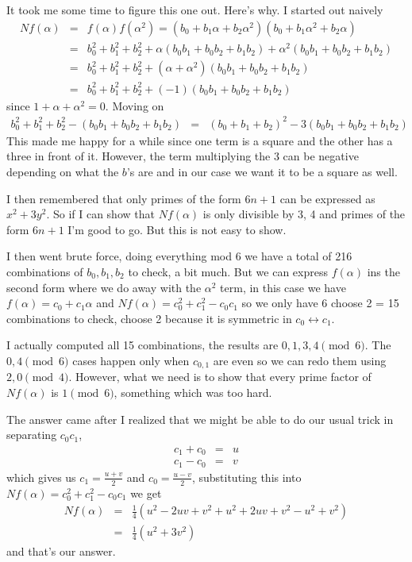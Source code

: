 \documentclass[aps,preprint,preprintnumbers,nofootinbib,showpacs,prd]{revtex4-1}
\newcommand{\nbea}{\begin{eqnarray*}}
\newcommand{\neea}{\end{eqnarray*}}
\begin{document}
It took me some time to figure this one out. Here's why. I started out naively
%
\nbea
Nf(\alpha) & = & f(\alpha)f(\alpha^2) = (b_0 + b_1\alpha + b_2\alpha^2)(b_0 + b_1\alpha^2 + b_2\alpha) \\
& = & b_0^2 + b_1^2 + b_2^2 + \alpha(b_0b_1 + b_0b_2 + b_1b_2) + \alpha^2(b_0b_1 + b_0b_2 + b_1b_2) \\
& = & b_0^2 + b_1^2 + b_2^2 + (\alpha + \alpha^2)(b_0b_1 + b_0b_2 + b_1b_2)\\
& = & b_0^2 + b_1^2 + b_2^2 + (-1)(b_0b_1 + b_0b_2 + b_1b_2)
\neea
%
since $1 + \alpha + \alpha^2 = 0$. Moving on
%
\nbea
b_0^2 + b_1^2 + b_2^2 - (b_0b_1 + b_0b_2 + b_1b_2) & = & (b_0 + b_1 + b_2)^2 - 3 (b_0b_1 + b_0b_2 + b_1b_2)
\neea
%
This made me happy for a while since one term is a square and the other has a three in front of it. However, the term multiplying the 3 can be negative depending on what the $b$'s are and in our case we want it to be a square as well.

I then remembered that only primes of the form $6n + 1$ can be expressed as $x^2 + 3y^2$. So if I can show that $Nf(\alpha)$ is only divisible by 3, 4 and primes of the form $6n + 1$ I'm good to go. But this is not easy to show.

I then went brute force, doing everything mod 6 we have a total of 216 combinations of $b_0, b_1, b_2$ to check, a bit much.  But we can express $f(\alpha)$ ins the second form where we do away with the $\alpha^2$ term, in this case we have $f(\alpha) = c_0 + c_1\alpha$ and $Nf(\alpha) = c_0^2+  c_1^2 - c_0c_1$ so we only have 6 choose 2 = 15 combinations to check, choose 2 because it is symmetric in $c_0 \leftrightarrow c_1$.

I actually computed all 15 combinations, the results are $0,1,3,4 \pmod{6}$. The $0,4 \pmod{6}$ cases happen only when $c_{0,1}$ are even so we can redo them using $2,0 \pmod{4}$. However, what we need is to show that every prime factor of $Nf(\alpha)$ is $1 \pmod{6}$, something which was too hard.

The answer came after I realized that we might be able to do our usual trick in separating $c_0c_1$, 
%
\nbea
c_1 + c_0 & = & u \\
c_1 - c_0 & = & v
\neea
%
which gives us $c_1 = \frac{u + v}{2}$ and $c_0 = \frac{u - v}{2}$, substituting this into $Nf(\alpha) = c_0^2 + c_1^2 - c_0c_1$ we get
%
\nbea
Nf(\alpha) & = & \frac{1}{4} (u^2  - 2uv + v^2 + u^2 + 2uv + v^2 - u^2 + v^2) \\
& = & \frac{1}{4} (u^2 + 3v^2)
\neea
%
and that's our answer.
\end{document}
